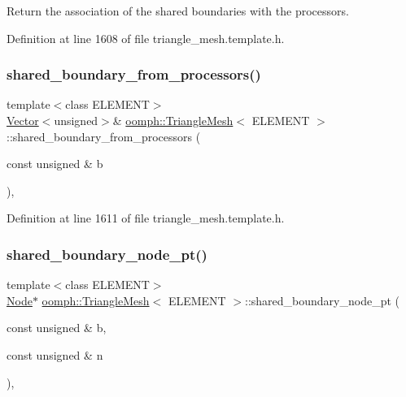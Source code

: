 Return the association of the shared boundaries with the processors. 



Definition at line 1608 of file triangle\+\_\+mesh.\+template.\+h.

\mbox{\label{classoomph_1_1TriangleMesh_a8b2a688aa766adadf29ecc4394a192b8}} 
\subsubsection{\texorpdfstring{shared\+\_\+boundary\+\_\+from\+\_\+processors()}{shared\_boundary\_from\_processors()}\hspace{0.1cm}{\footnotesize\ttfamily [2/2]}}
{\footnotesize\ttfamily template$<$class E\+L\+E\+M\+E\+NT$>$ \\
\hyperlink{classoomph_1_1Vector}{Vector}$<$unsigned$>$\& \hyperlink{classoomph_1_1TriangleMesh}{oomph\+::\+Triangle\+Mesh}$<$ E\+L\+E\+M\+E\+NT $>$\+::shared\+\_\+boundary\+\_\+from\+\_\+processors (\begin{DoxyParamCaption}\item[{const unsigned \&}]{b }\end{DoxyParamCaption})\hspace{0.3cm}{\ttfamily [inline]}, {\ttfamily [protected]}}



Definition at line 1611 of file triangle\+\_\+mesh.\+template.\+h.

\mbox{\label{classoomph_1_1TriangleMesh_a9605f96f76e7f00b3e0f8130e5118029}} 
\subsubsection{\texorpdfstring{shared\+\_\+boundary\+\_\+node\+\_\+pt()}{shared\_boundary\_node\_pt()}}
{\footnotesize\ttfamily template$<$class E\+L\+E\+M\+E\+NT$>$ \\
\hyperlink{classoomph_1_1Node}{Node}$\ast$ \hyperlink{classoomph_1_1TriangleMesh}{oomph\+::\+Triangle\+Mesh}$<$ E\+L\+E\+M\+E\+NT $>$\+::shared\+\_\+boundary\+\_\+node\+\_\+pt (\begin{DoxyParamCaption}\item[{const unsigned \&}]{b,  }\item[{const unsigned \&}]{n }\end{DoxyParamCaption})\hspace{0.3cm}{\ttfamily [inline]}, {\ttfamily [protected]}}



